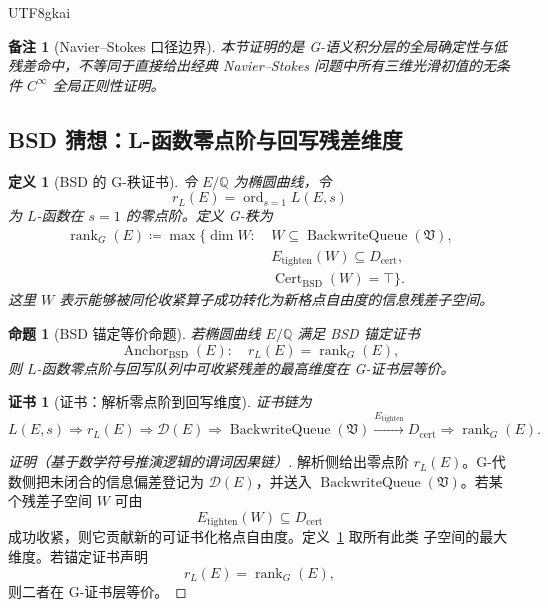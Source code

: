 \documentclass[12pt]{article}
\newtheorem{definition}{定义}[section]
\newtheorem{proposition}{命题}[section]
\newtheorem{remark}{备注}[section]
\newtheorem{Certificate}{证书}[section]
\newcommand{\QQ}{\mathbb{Q}}
\newcommand{\Vsys}{\mathfrak V}
\newcommand{\DefEq}{\coloneqq}
\newcommand{\Dcal}{\mathcal{D}}
\DeclareMathOperator{\Cert}{Cert}
\DeclareMathOperator{\Rank}{rank}
\DeclareMathOperator{\BackwriteQueue}{BackwriteQueue}
\DeclareMathOperator{\Anchor}{Anchor}
\begin{document}
\begin{CJK*}{UTF8}{gkai}
\begin{remark}[Navier--Stokes 口径边界]
本节证明的是 G-语义积分层的全局确定性与低残差命中，不等同于直接给出经典
Navier--Stokes 问题中所有三维光滑初值的无条件 \(C^\infty\) 全局正则性证明。
\end{remark}

\subsection{BSD 猜想：L-函数零点阶与回写残差维度}
\label{subsec:tex59-bsd}

\begin{definition}[BSD 的 G-秩证书]
\label{def:tex59-bsd-rank}
令 \(E/\QQ\) 为椭圆曲线，令
\[
  r_L(E)=\operatorname{ord}_{s=1}L(E,s)
\]
为 \(L\)-函数在 \(s=1\) 的零点阶。定义 G-秩为
\[
  \begin{aligned}
  \Rank_G(E)
  \DefEq
  \max\{\dim W:\ &
  W\subseteq\BackwriteQueue(\Vsys),\\
  &
  E_{\mathrm{tighten}}(W)\subseteq D_{\mathrm{cert}},\\
  &
  \Cert_{\mathrm{BSD}}(W)=\top\}.
  \end{aligned}
\]
这里 \(W\) 表示能够被同伦收紧算子成功转化为新格点自由度的信息残差子空间。
\end{definition}

\begin{proposition}[BSD 锚定等价命题]
\label{prop:tex59-bsd-anchor}
若椭圆曲线 \(E/\QQ\) 满足 BSD 锚定证书
\[
  \Anchor_{\mathrm{BSD}}(E):
  \quad
  r_L(E)=\Rank_G(E),
\]
则 \(L\)-函数零点阶与回写队列中可收紧残差的最高维度在 G-证书层等价。
\end{proposition}

\begin{Certificate}[证书：解析零点阶到回写维度]
\label{cert:tex59-bsd-anchor}
证书链为
\[
  L(E,s)
  \Longrightarrow
  r_L(E)
  \Longrightarrow
  \Dcal(E)
  \Longrightarrow
  \BackwriteQueue(\Vsys)
  \xrightarrow{E_{\mathrm{tighten}}}
  D_{\mathrm{cert}}
  \Longrightarrow
  \Rank_G(E).
\]
\end{Certificate}

\begin{proof}[证明（基于数学符号推演逻辑的谓词因果链）]
解析侧给出零点阶 \(r_L(E)\)。G-代数侧把未闭合的信息偏差登记为
\(\Dcal(E)\)，并送入 \(\BackwriteQueue(\Vsys)\)。若某个残差子空间 \(W\) 可由
\[
  E_{\mathrm{tighten}}(W)\subseteq D_{\mathrm{cert}}
\]
成功收紧，则它贡献新的可证书化格点自由度。定义~\ref{def:tex59-bsd-rank} 取所有此类
子空间的最大维度。若锚定证书声明
\[
  r_L(E)=\Rank_G(E),
\]
则二者在 G-证书层等价。
\end{proof}


\end{CJK*}
\end{document}
